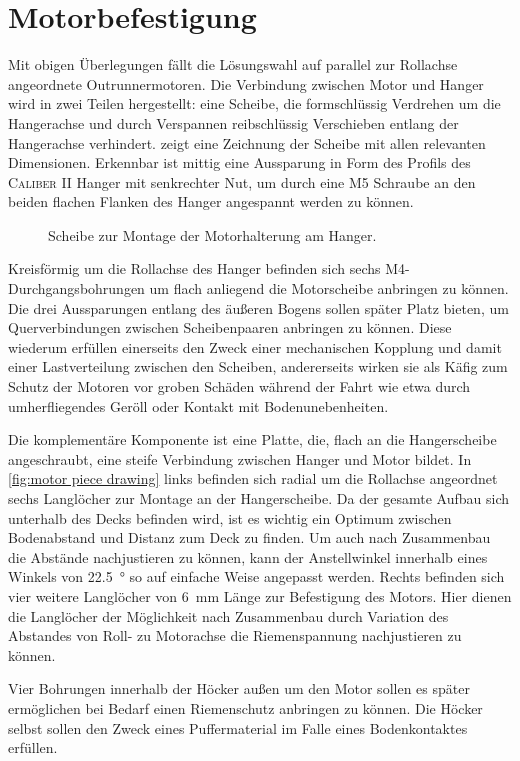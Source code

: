 	\section{Motorbefestigung}\label{sec:motorbefestigung}
		Mit obigen Überlegungen fällt die Lösungswahl auf parallel zur Rollachse angeordnete Outrunnermotoren.
		Die Verbindung zwischen Motor und Hanger wird in zwei Teilen hergestellt: eine Scheibe, die formschlüssig Verdrehen um die Hangerachse und durch Verspannen reibschlüssig Verschieben entlang der Hangerachse verhindert.
		 zeigt eine Zeichnung der Scheibe mit allen relevanten Dimensionen.
		Erkennbar ist mittig eine Aussparung in Form des Profils des \textsc{Caliber II} Hanger mit senkrechter Nut, um durch eine M5 Schraube an den beiden flachen Flanken des Hanger angespannt werden zu können.
		\begin{figure}[h]
			\centering
			
			\caption[Scheibe zur Montage der Motorhalterung am Hanger]{Scheibe zur Montage der Motorhalterung am Hanger.}
			\label{fig:hanger clamp drawing}
		\end{figure}
		Kreisförmig um die Rollachse des Hanger befinden sich sechs M4-Durchgangsbohrungen um flach anliegend die Motorscheibe anbringen zu können.
		Die drei Aussparungen entlang des äußeren Bogens sollen später Platz bieten, um Querverbindungen zwischen Scheibenpaaren anbringen zu können.
		Diese wiederum erfüllen einerseits den Zweck einer mechanischen Kopplung und damit einer Lastverteilung zwischen den Scheiben, andererseits wirken sie als Käfig zum Schutz der Motoren vor groben Schäden während der Fahrt wie etwa durch umherfliegendes Geröll oder Kontakt mit Bodenunebenheiten.\par\medskip
		Die komplementäre Komponente ist eine Platte, die, flach an die Hangerscheibe angeschraubt, eine steife Verbindung zwischen Hanger und Motor bildet.
		In \cref{fig:motor piece drawing} links befinden sich radial um die Rollachse angeordnet sechs Langlöcher zur Montage an der Hangerscheibe.
		Da der gesamte Aufbau sich unterhalb des Decks befinden wird, ist es wichtig ein Optimum zwischen Bodenabstand und Distanz zum Deck zu finden.
		Um auch nach Zusammenbau die Abstände nachjustieren zu können, kann der Anstellwinkel innerhalb eines Winkels von \qty{22,5}{\degree} so auf einfache Weise angepasst werden.
		Rechts befinden sich vier weitere Langlöcher von \qty{6}{\milli\metre} Länge zur Befestigung des Motors.
		Hier dienen die Langlöcher der Möglichkeit nach Zusammenbau durch Variation des Abstandes von Roll- zu Motorachse die Riemenspannung nachjustieren zu können.\par
		Vier Bohrungen innerhalb der Höcker außen um den Motor sollen es später ermöglichen bei Bedarf einen Riemenschutz anbringen zu können.
		Die Höcker selbst sollen den Zweck eines Puffermaterial im Falle eines Bodenkontaktes erfüllen.

